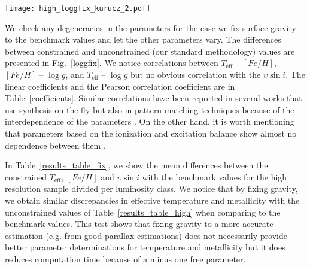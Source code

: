 \documentclass[fleqn,usenatbib]{mnras}
\begin{document}
\begin{figure*}
  \centering
   \texttt{[image: high\_loggfix\_kurucz\_2.pdf]}
  \caption{Differences in parameters between gravity constrained and unconstrained values (results from Sect.~\ref{high}). $\Delta \log g$ corresponds to $\log g$ from the benchmark values 
  minus $\log g$ from this work.}
  \label{loggfix}
\end{figure*}

We check any degeneracies in the parameters for the case we fix surface gravity to the benchmark values and let the other parameters vary. The differences between constrained and unconstrained 
(our standard methodology) values are presented in Fig.~\ref{loggfix}. We notice correlations between $T_{\mathrm{eff}}$ -- $[Fe/H]$, $[Fe/H]$ -- $\log g$, and 
$T_{\mathrm{eff}}$ -- $\log g$ but no obvious correlation with the $\upsilon\sin i$. The linear coefficients and the Pearson correlation coefficient are in Table~\ref{coefficients}. 
Similar correlations have been reported in several works that use synthesis on-the-fly but also in pattern matching techniques because of the interdependence of the parameters 
\citep{torres12, blanco2014a, Kordopatis2011}. On the other hand, it is worth mentioning that parameters based on the ionization and excitation balance show almost no dependence between 
them \citep{mortier13_gravity}. 

In Table~\ref{results_table_fix}, we show the mean differences between the constrained $ T_{\mathrm{eff}}$, $[Fe/H]$ and $\upsilon\sin i$ with the benchmark values for the high resolution 
sample divided per luminosity class. We notice that by fixing gravity, we obtain similar discrepancies in effective temperature and metallicity with the unconstrained values of 
Table~\ref{results_table_high} when comparing to the benchmark values. This test shows that fixing gravity to a more accurate estimation (e.g. from good parallax estimations) does not 
necessarily provide better parameter determinations for temperature and metallicity but it does reduces computation time because of a minus one free parameter.  
\end{document}

